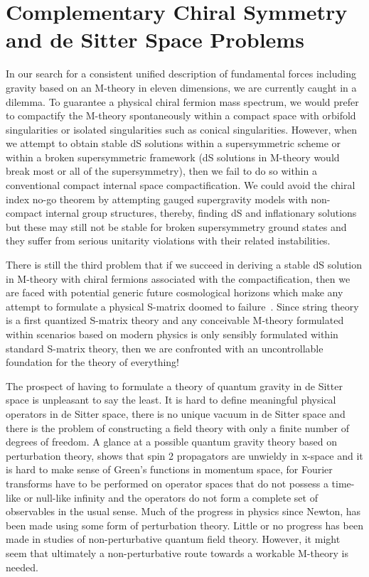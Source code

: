 \documentclass[a4paper,12pt]{article}
\begin{document}
\section{\bf Complementary Chiral Symmetry and de Sitter Space Problems}

In our search for a consistent unified description of fundamental forces
including gravity based on an M-theory in eleven dimensions, we are
currently caught in a dilemma. To guarantee a physical chiral
fermion mass spectrum, we would prefer to compactify the M-theory
spontaneously within a compact space with orbifold singularities or
isolated singularities such as conical singularities. However, when we
attempt to obtain stable dS solutions within a supersymmetric
scheme or within a broken supersymmetric framework (dS solutions
in M-theory would break most or all of the supersymmetry), then
we fail to do so within a conventional compact internal space
compactification. We could avoid the chiral index no-go theorem
by attempting gauged supergravity models with non-compact
internal group structures, thereby, finding dS and
inflationary solutions but these may still not be stable for
broken supersymmetry ground states and they suffer from serious
unitarity violations with their related instabilities.

There is still the third problem that if we succeed in deriving a
stable dS solution in M-theory with chiral fermions associated
with the compactification, then we are faced with potential
generic future cosmological horizons which make any attempt to
formulate a physical S-matrix doomed to failure~\cite{Bousso,Fischler}.
Since string theory is a first quantized S-matrix theory and any
conceivable M-theory formulated within scenarios based on modern
physics is only sensibly formulated within standard S-matrix
theory, then we are confronted with an uncontrollable foundation
for the theory of everything!

The prospect of having to formulate a theory of quantum gravity in de
Sitter space is unpleasant to say the least. It is hard to define
meaningful physical operators in de Sitter space, there is no unique vacuum
in de Sitter space and there is the problem of constructing a field theory
with only a finite number of degrees of freedom. A glance at a possible
quantum gravity theory based on perturbation theory, shows that spin 2
propagators are unwieldy in x-space and it is hard to make sense of Green's
functions in
momentum space, for Fourier transforms have to be performed on
operator spaces that do not possess a time-like or null-like
infinity and the operators do not form a complete set of
observables in the usual sense. Much of the progress in
physics since Newton, has been made using some form of
perturbation theory. Little or no progress has been made in
studies of non-perturbative quantum field theory. However, it
might seem that ultimately a non-perturbative route towards a workable
M-theory is needed.
\end{document}
